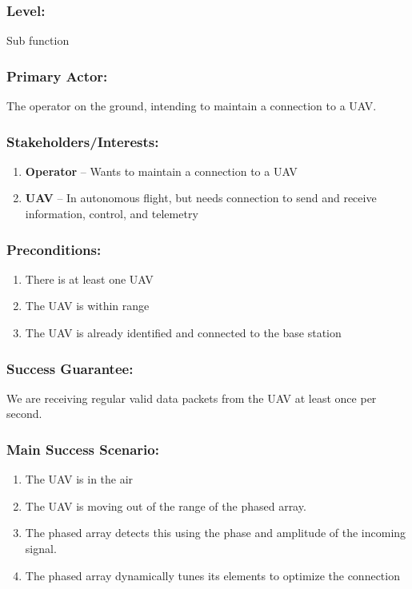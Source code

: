 \documentclass[ProductRequirements.tex]{subfiles}
\begin{document}
	\subsubsection*{Level:}
	Sub function
	\subsubsection*{Primary Actor:}
	The operator on the ground, intending to maintain a connection to a UAV.
	\subsubsection*{Stakeholders/Interests:}
	\begin{enumerate}\itemsep1pt
		\item \textbf{Operator} -- Wants to maintain a connection to a UAV
		\item \textbf{UAV} -- In autonomous flight, but needs connection to send and receive information, control, and telemetry
	\end{enumerate}
	\subsubsection*{Preconditions:}
	\begin{enumerate}\itemsep1pt
		\item There is at least one UAV
		\item The UAV is within range
		\item The UAV is already identified and connected to the base station
	\end{enumerate}
	\subsubsection*{Success Guarantee:}
	We are receiving regular valid data packets from the UAV at least once per second. 
	\subsubsection*{Main Success Scenario:}
	\begin{enumerate}\itemsep1pt
		\item The UAV is in the air
		\item The UAV is moving out of the range of the phased array.
		\item The phased array detects this using the phase and amplitude of the incoming signal.
		\item The phased array dynamically tunes its elements to optimize the connection 
	\end{enumerate}
\end{document}
